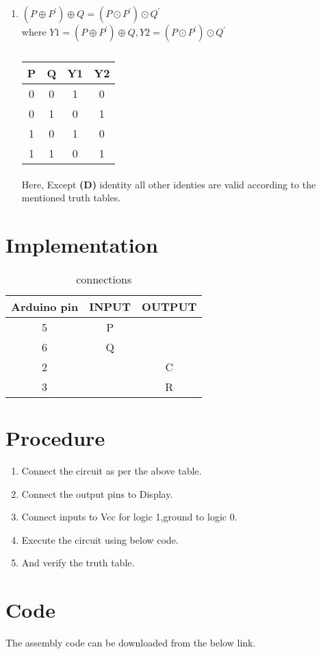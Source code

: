 \documentclass[a4paper,11pt,twocolumn]{article}
\begin{document}
\begin{enumerate}[label=\textbf{(\Alph*})]
	\item \textbf{$(P\oplus P^{\prime})\oplus Q = (P\odot P^{\prime})\odot Q^{\prime}$ }\\
where $Y1=(P\oplus P^{\prime})\oplus Q,Y2=(P\odot
    P^{\prime})\odot Q^{\prime}$\\
\bigskip
\begin{table}[ht!]
	\centering
	\begin{tabular}{ |c |c |c |c |} 
\hline 
\newline 
		\textbf{P} & \textbf{Q} & \textbf{Y1} &  \textbf{Y2}\\ 
\hline 
		0 & 0 &1 &0\\   
 		0 & 1 &0 &1\\  
 		1 & 0 &1 &0\\  
 		1 & 1 &0 &1\\  
 \hline 
 \end{tabular}
	\caption{}
\end{table}
\bigskip

\paragraph{}
	Here, Except \textbf{(D)} identity all other identies are valid according to the mentioned truth tables.
\end{enumerate}
\bigskip

\section{Implementation}
\begin{table}[h]
  \centering
  \caption{connections}
  \begin{tabular}{|c|c|c|}
\hline
Arduino pin & INPUT & OUTPUT\\
\hline
5 & P &\\
\hline
6 & Q &\\
\hline
2 & & C\\
\hline
3 & & R\\
\hline
  \end{tabular}
\end{table}

\section{Procedure}
\begin{enumerate}

   \item Connect the circuit as per the above table.\\
   \item Connect the output pins to Display.\\
   \item Connect inputs to Vcc for logic 1,ground to logic 0.\\
   \item Execute the circuit using below code.\\
   \item And verify the truth table.\\
\end{enumerate}
\section{Code}
	The assembly code can be downloaded from the below link.
\end{document}
